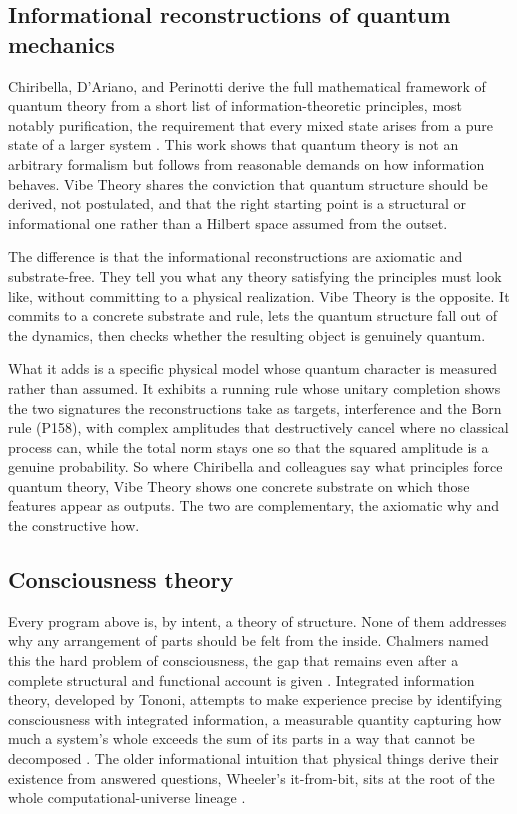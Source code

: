 \subsection{Informational reconstructions of quantum mechanics}

Chiribella, D'Ariano, and Perinotti derive the full mathematical framework of quantum theory from a short
list of information-theoretic principles, most notably purification, the requirement that every mixed state
arises from a pure state of a larger system \cite{chiribella2011}. This work shows that quantum theory is not
an arbitrary formalism but follows from reasonable demands on how information behaves. Vibe Theory shares the
conviction that quantum structure should be derived, not postulated, and that the right starting point is a
structural or informational one rather than a Hilbert space assumed from the outset.

The difference is that the informational reconstructions are axiomatic and substrate-free. They tell you what
any theory satisfying the principles must look like, without committing to a physical realization. Vibe Theory
is the opposite. It commits to a concrete substrate and rule, lets the quantum structure fall out of the
dynamics, then checks whether the resulting object is genuinely quantum.

What it adds is a specific physical
model whose quantum character is measured rather than assumed. It exhibits a running rule whose unitary
completion shows the two signatures the reconstructions take as targets, interference and the Born rule (P158),
with complex amplitudes that destructively cancel where no classical process can, while the total norm stays
one so that the squared amplitude is a genuine probability. So where Chiribella and colleagues say what
principles force quantum theory, Vibe Theory shows one concrete substrate on which those features appear as
outputs. The two are complementary, the axiomatic why and the constructive how.

\subsection{Consciousness theory}

Every program above is, by intent, a theory of structure. None of them addresses why any arrangement of
parts should be felt from the inside. Chalmers named this the hard problem of consciousness, the gap that
remains even after a complete structural and functional account is given \cite{chalmers1995}. Integrated
information theory, developed by Tononi, attempts to make experience precise by identifying consciousness with
integrated information, a measurable quantity capturing how much a system's whole exceeds the sum of its parts
in a way that cannot be decomposed \cite{tononi2004}. The older informational intuition that physical things
derive their existence from answered questions, Wheeler's it-from-bit, sits at the root of the whole
computational-universe lineage \cite{wheeler1990}.

